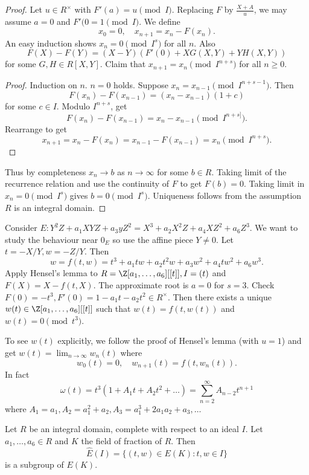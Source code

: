 \documentclass[a4paper]{article}
\theoremstyle{definition}
\theoremstyle{theorem}
\begin{document}
\begin{proof}
  Let \(u \in R^\times\) with \(F'(a) = u \pmod I\). Replacing \(F\) by \(\frac{X + A}{u}\), we may assume \(a = 0\) and \(F'(0 = 1 \pmod I\). We define
  \[
    x_0 = 0, \quad x_{n + 1} = x_n - F(x_n).
  \]
  An easy induction shows \(x_n = 0 \pmod{I^s}\) for all \(n\). Also
  \[
    F(X) - F(Y) = (X - Y) (F'(0) + X G(X, Y) + Y H(X, Y))
  \]
  for some \(G, H \in R[X, Y]\). Claim that \(x_{n + 1} = x_n \pmod{I^{n + s}}\) for all \(n \geq 0\).

  \begin{proof}
    Induction on \(n\). \(n = 0\) holds. Suppose \(x_n = x_{n - 1} \pmod{I^{n + s - 1}}\). Then
    \[
      F(x_n) - F(x_{n - 1}) = (x_n - x_{n - 1})(1 + c)
    \]
    for some \(c \in I\). Modulo \(I^{n + s}\), get
    \[
      F(x_n) - F(x_{n - 1}) = x_n - x_{n - 1} \pmod{I^{n + s]}}.
    \]
    Rearrange to get
    \[
      x_{n + 1} = x_n - F(x_n) = x_{n - 1} - F(x_{n - 1}) = x_n \pmod{I^{n + s}}.
    \]
  \end{proof}
  Thus by completeness \(x_n \to b\) as \(n \to \infty\) for some \(b \in R\). Taking limit of the recurrence relation and use the continuity of \(F\) to get \(F(b) = 0\). Taking limit in \(x_n = 0 \pmod{I^s}\) gives \(b = 0 \pmod{I^s}\). Uniqueness follows from the assumption \(R\) is an integral domain.
\end{proof}

Consider \(E: Y^2Z + a_1 XYZ + a_3 yZ^2 = X^3 + a_2X^2Z + a_4XZ^2 + a_6Z^3\). We want to study the behaviour near \(0_E\) so use the affine piece \(Y \neq 0\). Let \(t = -X/Y, w = -Z/Y\). Then
\[
  w = f(t, w) = t^3 + a_1tw + a_2t^2w + a_3w^2 + a_4tw^2 + a_6w^3.
\]
Apply Hensel's lemma to \(R = \Z[a_1, \dots, a_6][[t]], I = (t)\) and \(F(X) = X - f(t, X)\). The approximate root is \(a = 0\) for \(s = 3\). Check \(F(0) = -t^3, F'(0) = 1 - a_1t - a_2t^2 \in R^\times\). Then there exists a unique \(w(t) \in \Z[a_1, \dots, a_6][[t]]\) such that \(w(t) = f(t, w(t))\) and \(w(t) = 0 \pmod{t^3}\).

To see \(w(t)\) explicitly, we follow the proof of Hensel's lemma (with \(u = 1\)) and get \(w(t) = \lim_{n \to \infty} w_n(t)\) where
\[
  w_0(t) = 0, \quad w_{n + 1}(t) = f(t, w_n(t)).
\]
In fact
\[
  \omega(t) = t^3 (1 + A_1t + A_2t^2 + \dots) = \sum_{n = 2}^\infty A_{n - 2}t^{n + 1}
\]
where \(A_1 = a_1, A_2 = a_1^2 + a_2, A_3 = a_1^3 + 2a_1a_2 + a_3, \dots\)

\begin{lemma}
  Let \(R\) be an integral domain, complete with respect to an ideal \(I\). Let \(a_1, \dots, a_6 \in R\) and \(K\) the field of fraction of \(R\). Then
  \[
    \hat E(I) = \{(t, w) \in E(K): t, w \in I\}
  \]
  is a subgroup of \(E(K)\).
\end{lemma}
\end{document}
